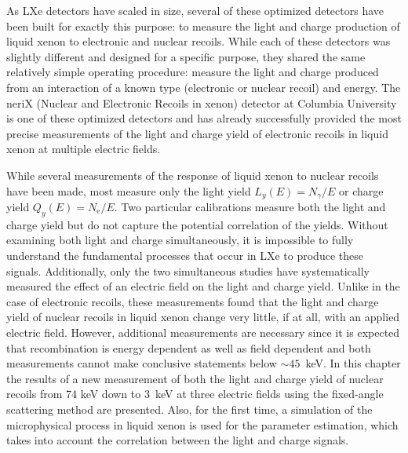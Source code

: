 As LXe detectors have scaled in size, several of these optimized detectors have been built for exactly this purpose: to measure the light and charge production of liquid xenon to electronic and nuclear recoils.  While each of these detectors was slightly different and designed for a specific purpose, they shared the same relatively simple operating procedure: measure the light and charge produced from an interaction of a known type (electronic or nuclear recoil) and energy.  The neriX (Nuclear and Electronic Recoils in xenon) detector at Columbia University is one of these optimized detectors and has already successfully provided the most precise measurements of the light and charge yield of electronic recoils in liquid xenon at multiple electric fields.  

While several measurements of the response of liquid xenon to nuclear recoils have been made, most measure only the light yield $L_y(E) = N_{\gamma}/E$ or charge yield $Q_y(E) = N_{\textrm{e}}/E$.  Two particular calibrations \cite{aprile2005scintillation, manzur2010scintillation} measure both the light and charge yield but do not capture the potential correlation of the yields.  Without examining both light and charge simultaneously, it is impossible to fully understand the fundamental processes that occur in LXe to produce these signals.  Additionally, only the two simultaneous studies \cite{aprile2005scintillation, manzur2010scintillation} have systematically measured the effect of an electric field on the light and charge yield.  Unlike in the case of electronic recoils, these measurements found that the light and charge yield of nuclear recoils in liquid xenon change very little, if at all, with an applied electric field.  However, additional measurements are necessary since it is expected that recombination is energy dependent as well as field dependent \cite{thomas1987recombination} and both measurements cannot make conclusive statements below $\sim 45$~keV.  In this chapter the results of a new measurement of both the light and charge yield of nuclear recoils from 74 keV down to 3~keV at three electric fields using the fixed-angle scattering method are presented.  Also, for the first time, a simulation of the microphysical process in liquid xenon is used for the parameter estimation, which takes into account the correlation between the light and charge signals.


